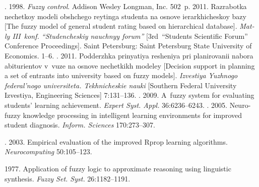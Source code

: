   






  \begin{multicols}{2}

\renewcommand{\bibname}{\protect\rmfamily References}

{\small\frenchspacing
 {%
 \begin{thebibliography}{9}
.  1998. \textit{Fuzzy control}. Addison 
Wesley Longman, Inc. 502~p.
 2011. Razrabotka nechetkoy modeli obshchego reytinga 
studenta na osnove ierarkhicheskoy bazy [The fuzzy model of general student 
rating based on hierarchical database]. \textit{Mat-ly III~konf. ``Studencheskiy 
nauchnyy forum''}  [3rd~``Students Scientific Forum'' Conference Proceedings]. 
Saint Petersburg: Saint Petersburg State University of Economics. 1--6.
. 2011. Podderzhka pri\-nya\-tiya 
resheniya pri planirovanii nabora abiturientov v~vuze na osnove nechetkikh 
modeley [Decision support in planning a set of entrants into university based on 
fuzzy models]. \textit{Izvestiya Yuzhnogo federal'nogo universiteta. 
Tekhnicheskie nauki} [Southern Federal University Izvestiya, Engineering
Sciences] 7:131--136.
. 2009. A~fuzzy system for evaluating students' 
learning achievement. \textit{Expert Syst. Appl.} 36:6236--6243. 
. 2005. Neuro-fuzzy knowledge processing in intelligent learning 
environments for improved student diagnosis. \textit{Inform. Sciences}  
170:273--307. 



. 2003. Empirical evaluation of the improved 
Rprop learning algorithms. \textit{Neurocomputing} 50:105--123.

 1977. Application of fuzzy logic to approximate 
reasoning using linguistic synthesis. \textit{Fuzzy Set. Syst.} 26:1182--1191.


\end{thebibliography}}}
\end{multicols}
